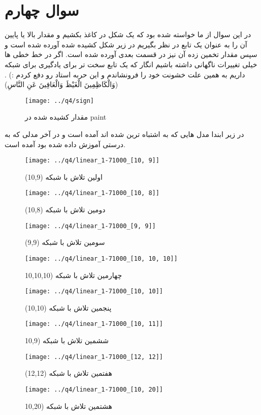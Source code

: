 \documentclass[a4paper,12pt]{article}
\begin{document}
\section{سوال چهارم}
در این سوال از ما خواسته شده بود که یک شکل در کاغذ بکشیم و مقدار بالا یا پایین آن را به عنوان یک تابع در نظر بگیریم در زیر شکل کشیده شده آورده شده است و سپس مقدار تخمین زده آن نیز در قسمت بعدی آورده شده است. اگر در خط خطی ها خیلی تغییرات ناگهانی داشته باشیم انگار که یک تابع سخت تر برای یادگیری برای شبکه داریم به همین علت خشونت خود را فرونشاندم و این حربه استاد رو دفع کردم :) . (وَالْكَاظِمِينَ الْغَيْظَ وَالْعَافِينَ عَنِ النَّاسِ)
\begin{figure}[H]
\begin{center}

  \texttt{[image: ../q4/sign]}
  \center
  \caption{ مقدار کشیده شده در paint}
\end{center}
\end{figure}
در زیر ابندا مدل هایی که به اشتباه ترین شده اند آمده است و در آخر مدلی که به درستی آموزش داده شده بود آمده است.

\begin{figure}[!htb]
  \texttt{[image: ../q4/linear\_1-71000\_[10, 9]]}
  \caption{  اولین تلاش با شبکه (10,9) }
\endminipage\hfill
{}
  \texttt{[image: ../q4/linear\_1-71000\_[10, 8]]}
  \caption{دومین تلاش با شبکه (10,8) }
\endminipage\hfill
\end{figure}

\begin{figure}[!htb]
  \texttt{[image: ../q4/linear\_1-71000\_[9, 9]]}
  \caption{  سومین تلاش با شبکه (9,9) }
\endminipage\hfill
{}
  \texttt{[image: ../q4/linear\_1-71000\_[10, 10, 10]]}
  \caption{چهارمین تلاش با شبکه (10,10,10 }
\endminipage\hfill
\end{figure}

\begin{figure}[!htb]
  \texttt{[image: ../q4/linear\_1-71000\_[10, 10]]}
  \caption{  پنجمین تلاش با شبکه (10,10) }
\endminipage\hfill
{}
  \texttt{[image: ../q4/linear\_1-71000\_[10, 11]]}
  \caption{ششمین تلاش با شبکه (10,9 }
\endminipage\hfill
\end{figure}


\begin{figure}[!htb]
  \texttt{[image: ../q4/linear\_1-71000\_[12, 12]]}
  \caption{  هفتمین تلاش با شبکه (12,12) }
\endminipage\hfill
{}
  \texttt{[image: ../q4/linear\_1-71000\_[10, 20]]}
  \caption{هشتمین تلاش با شبکه (10,20 }
\endminipage\hfill
\end{figure}
\end{document}
